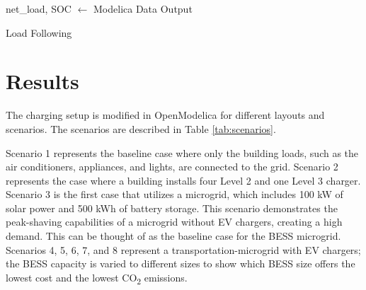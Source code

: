 \documentclass[conference]{IEEEtran}
\begin{document}
		\begin{algorithm}
			net\_load, SOC $\gets$ Modelica Data Output
			\caption{Load Following}
			\label{alg:peakshavingflatrate}
		\end{algorithm}
\section{Results}
		The charging setup is modified in OpenModelica for different layouts and scenarios. The scenarios are described in Table \ref{tab:scenarios}.
		
		Scenario 1 represents the baseline case where only the building loads, such as the air conditioners, appliances, and lights, are connected to the grid. Scenario 2 represents the case where a building installs four Level 2 and one Level 3 charger. Scenario 3 is the first case that utilizes a microgrid, which includes 100 kW of solar power and 500 kWh of battery storage. This scenario demonstrates the peak-shaving capabilities of a microgrid without EV chargers, creating a high demand. This can be thought of as the baseline case for the BESS microgrid. Scenarios 4, 5, 6, 7, and 8 represent a transportation-microgrid with EV chargers; the BESS capacity is varied to different sizes to show which BESS size offers the lowest cost and the lowest CO\textsubscript{2} emissions. 
		
\end{document}
